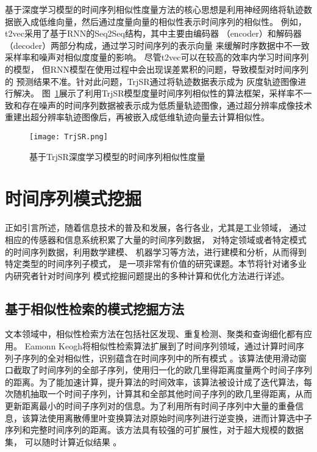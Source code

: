 基于深度学习模型的时间序列相似性度量方法的核心思想是利用神经网络将轨迹数据嵌入成低维向量，然后通过度量向量的相似性表示时间序列的相似性。
例如，t2vec采用了基于RNN的Seq2Seq结构，其中主要由编码器
（encoder）和解码器（decoder）两部分构成，通过学习时间序列的表示向量
来缓解时序数据中不一致采样率和噪声对相似度度量的影响\cite{DBLP:conf/icde/LiZCJW18}。
尽管t2vec可以在较高的效率内学习时间序列的模型，
但RNN模型在使用过程中会出现误差累积的问题，导致模型对时间序列的
预测结果不准。针对此问题，TrjSR通过将轨迹数据表示成为
灰度轨迹图像进行解决\cite{DBLP:conf/ijcnn/CaoTWWX21}。
图~\ref{fig:TrjSR}展示了利用TrjSR模型度量时间序列相似性的算法框架，采样率不一致和存在噪声的时间序列数据被表示成为低质量轨迹图像，通过超分辨率成像技术重建出超分辨率轨迹图像后，再被嵌入成低维轨迹向量去计算相似性。
\begin{figure}
  \centering
  \texttt{[image: TrjSR.png]}
  \caption{基于TrjSR深度学习模型的时间序列相似性度量}
  \label{fig:TrjSR}
\end{figure}

\section{时间序列模式挖掘}
正如引言所述，随着信息技术的普及和发展，各行各业，尤其是工业领域，
通过相应的传感器和信息系统积累了大量的时间序列数据，
对特定领域或者特定模式的时间序列数据，利用数学建模、
机器学习等方法，进行建模和分析，从而得到特定类型的时间序列子模式，
是一项非常有价值的研究课题。本节将针对诸多业内研究者针对时间序列
模式挖掘问题提出的多种计算和优化方法进行详述。

\subsection{基于相似性检索的模式挖掘方法}
文本领域中，相似性检索方法在包括社区发现、重复检测、聚类和查询细化都有应用\cite{DBLP:conf/www/BayardoMS07}。
Eamonn Keogh将相似性检索算法扩展到了时间序列领域，通过计算时间序列子序列的全对相似性，识别蕴含在时间序列中的所有模式
\cite{DBLP:conf/kdd/RakthanmanonCMBWZZK12}。该算法使用滑动窗口截取了时间序列的全部子序列，使用归一化的欧几里得距离度量两个时间子序列的距离。为了能加速计算，提升算法的时间效率，该算法被设计成了迭代算法，每次随机抽取一个时间子序列，计算其和全部其他时间子序列的欧几里得距离，从而更新距离最小的时间子序列对的信息。为了利用所有时间子序列中大量的重叠信息，该算法使用离散傅里叶变换算法对原始时间序列进行逆变换，进而计算选中子序列和完整时间序列的距离。该方法具有较强的可扩展性，对于超大规模的数据集，
可以随时计算近似结果
\cite{DBLP:conf/icdm/ZhuZSYFMBK16}。

